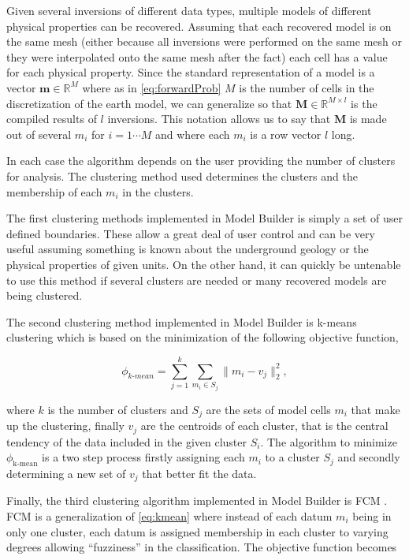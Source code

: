Given several inversions of different data types, multiple models of different physical properties can be recovered. Assuming that each recovered model is on the same mesh (either because all inversions were performed on the same mesh or they were interpolated onto the same mesh after the fact) each cell has a value for each physical property. Since the standard representation of a model is a vector $\mathbf m \in \mathbb R^M$ where as in \autoref{eq:forwardProb} $M$ is the number of cells in the discretization of the earth model, we can generalize so that $\mathbf M \in \mathbb R^{M\times l}$ is the compiled results of $l$ inversions. This notation allows us to say that $\mathbf M$ is made out of several $m_i$ for $i = 1 \cdots M$ and where each $m_i$ is a row vector $l$ long.

In each case the algorithm depends on the user providing the number of clusters for analysis. The clustering method used determines the clusters and the membership of each $m_i$ in the clusters.

The first clustering methods implemented in Model Builder is simply a set of user defined boundaries. These allow a great deal of user control and can be very useful assuming something is known about the underground geology or the physical properties of given units. On the other hand, it can quickly be untenable to use this method if several clusters are needed or many recovered models are being clustered.

The second clustering method implemented in Model Builder is k-means clustering \cite{gaf1984multivariate} which is based on the minimization of the following objective function,

\begin{equation}
 \phi_{k\text{-}mean} = \sum_{j=1}^k\sum_{m_i \in S_j}\|m_i - v_j\|_2^2, \label{eq:kmean}
\end{equation}


where $k$ is the number of clusters and $S_j$ are the sets of model cells $m_i$ that make up the clustering, finally $v_j$ are the centroids of each cluster, that is the central tendency of the data included in the given cluster $S_i$. The algorithm to minimize $\phi_{\text{k-mean}}$ is a two step process firstly assigning each $m_i$ to a cluster $S_j$ and secondly determining a new set of $v_j$ that better fit the data.

Finally, the third clustering algorithm implemented in Model Builder is \acf{FCM} \citep{sun2015multidomain}. \ac{FCM} is a generalization of \autoref{eq:kmean} where instead of each datum $m_i$ being in only one cluster, each datum is assigned membership in each cluster to varying degrees allowing ``fuzziness'' in the classification. The objective function becomes

